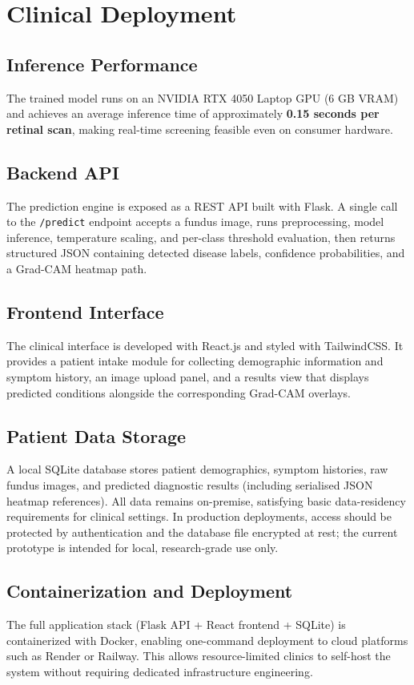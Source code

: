 \documentclass[conference]{IEEEtran}
\begin{document}
\section{Clinical Deployment}

\subsection{Inference Performance}
The trained model runs on an NVIDIA RTX 4050 Laptop GPU (6 GB VRAM) and achieves an average inference time of approximately \textbf{0.15 seconds per retinal scan}, making real-time screening feasible even on consumer hardware.

\subsection{Backend API}
The prediction engine is exposed as a REST API built with Flask. A single call to the \texttt{/predict} endpoint accepts a fundus image, runs preprocessing, model inference, temperature scaling, and per-class threshold evaluation, then returns structured JSON containing detected disease labels, confidence probabilities, and a Grad-CAM heatmap path.

\subsection{Frontend Interface}
The clinical interface is developed with React.js and styled with TailwindCSS. It provides a patient intake module for collecting demographic information and symptom history, an image upload panel, and a results view that displays predicted conditions alongside the corresponding Grad-CAM overlays.

\subsection{Patient Data Storage}
A local SQLite database stores patient demographics, symptom histories, raw fundus images, and predicted diagnostic results (including serialised JSON heatmap references). All data remains on-premise, satisfying basic data-residency requirements for clinical settings. In production deployments, access should be protected by authentication and the database file encrypted at rest; the current prototype is intended for local, research-grade use only.

\subsection{Containerization and Deployment}
The full application stack (Flask API + React frontend + SQLite) is containerized with Docker, enabling one-command deployment to cloud platforms such as Render or Railway. This allows resource-limited clinics to self-host the system without requiring dedicated infrastructure engineering.
\end{document}
